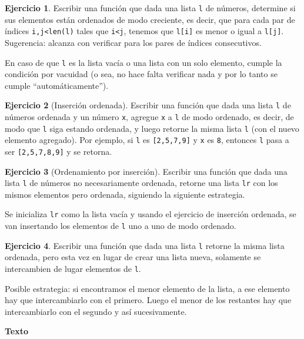 \documentclass[a4paper,12pt]{book}
\theoremstyle{definition}
\newtheorem{ejercicio}{Ejercicio}
\begin{document}
	\begin{ejercicio}
		Escribir una función que dada una lista {\tt l} de números, determine si sus elementos están ordenados de modo creciente, es decir, que para cada par de índices {\tt i,j<len(l)} tales que {\tt i<j}, tenemos que {\tt l[i]} es menor o igual a {\tt l[j]}. Sugerencia: alcanza con verificar para los pares de índices consecutivos.
		
		En caso de que {\tt l} es la lista vacía o una lista con un solo elemento, cumple la condición por vacuidad (o sea, no hace falta verificar nada y por lo tanto se cumple ``automáticamente''). 
	\end{ejercicio}
	
	\begin{ejercicio}[Inserción ordenada]
		Escribir una función que dada una lista {\tt l} de números ordenada y un número {\tt x}, agregue {\tt x} a {\tt l} de modo ordenado, es decir, de modo que {\tt l} siga estando ordenada, y luego retorne la misma lista {\tt l} (con el nuevo elemento agregado). Por ejemplo, si {\tt l} es {\tt [2,5,7,9]} y {\tt x} es {\tt 8}, entonces {\tt l} pasa a ser {\tt [2,5,7,8,9]} y se retorna.
	\end{ejercicio}
	
	\begin{ejercicio}[Ordenamiento por inserción]
		Escribir una función que dada una lista {\tt l} de números no necesariamente ordenada, retorne una lista {\tt lr} con los mismos elementos pero ordenada, siguiendo la siguiente estrategia.
		
		Se inicializa {\tt lr} como la lista vacía y usando el ejercicio de inserción ordenada, se van insertando los elementos de {\tt l} uno a uno de modo ordenado.
	\end{ejercicio}
	
	\begin{ejercicio}
		Escribir una función que dada una lista {\tt l} retorne la misma lista ordenada, pero esta vez en lugar de crear una lista nueva, solamente se intercambien de lugar elementos de {\tt l}.
		
		Posible estrategia: si encontramos el menor elemento de la lista, a ese elemento hay que intercambiarlo con el primero. Luego el menor de los restantes hay que intercambiarlo con el segundo y así sucesivamente.
	\end{ejercicio}
	
	\begin{center}
		{\textbf{Texto}}
	\end{center}
	
\end{document}
